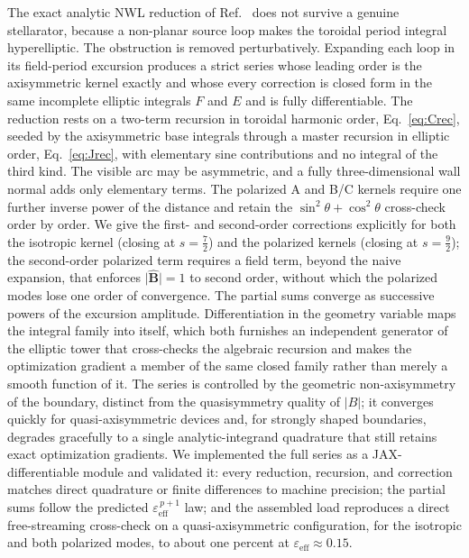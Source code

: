 \documentclass[11pt]{article}
\newcommand{\Bhat}{\hat{\bm{B}}}
\newcommand{\eps}{\varepsilon}
\begin{document}
The exact analytic NWL reduction of Ref.~\cite{schwartz2025} does not survive a genuine stellarator, because a non-planar source loop makes the toroidal period integral hyperelliptic. The obstruction is removed perturbatively. Expanding each loop in its field-period excursion produces a strict series whose leading order is the axisymmetric kernel exactly and whose every correction is closed form in the same incomplete elliptic integrals $F$ and $E$ and is fully differentiable. The reduction rests on a two-term recursion in toroidal harmonic order, Eq.~\eqref{eq:Crec}, seeded by the axisymmetric base integrals through a master recursion in elliptic order, Eq.~\eqref{eq:Jrec}, with elementary sine contributions and no integral of the third kind. The visible arc may be asymmetric, and a fully three-dimensional wall normal adds only elementary terms. The polarized A and B/C kernels require one further inverse power of the distance and retain the $\sin^2\theta+\cos^2\theta$ cross-check order by order. We give the first- and second-order corrections explicitly for both the isotropic kernel (closing at $s=\tfrac72$) and the polarized kernels (closing at $s=\tfrac92$); the second-order polarized term requires a field term, beyond the naive expansion, that enforces $\lvert\Bhat\rvert=1$ to second order, without which the polarized modes lose one order of convergence. The partial sums converge as successive powers of the excursion amplitude. Differentiation in the geometry variable maps the integral family into itself, which both furnishes an independent generator of the elliptic tower that cross-checks the algebraic recursion and makes the optimization gradient a member of the same closed family rather than merely a smooth function of it. The series is controlled by the geometric non-axisymmetry of the boundary, distinct from the quasisymmetry quality of $\lvert B\rvert$; it converges quickly for quasi-axisymmetric devices and, for strongly shaped boundaries, degrades gracefully to a single analytic-integrand quadrature that still retains exact optimization gradients. We implemented the full series as a JAX-differentiable module and validated it: every reduction, recursion, and correction matches direct quadrature or finite differences to machine precision; the partial sums follow the predicted $\eps_{\mathrm{eff}}^{\,p+1}$ law; and the assembled load reproduces a direct free-streaming cross-check on a quasi-axisymmetric configuration, for the isotropic and both polarized modes, to about one percent at $\eps_{\mathrm{eff}}\approx0.15$.
\end{document}

